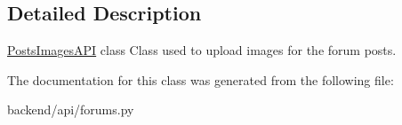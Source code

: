 \subsection{Detailed Description}
\hyperlink{classbackend_1_1api_1_1forums_1_1_posts_images_a_p_i}{Posts\+Images\+A\+P\+I} class Class used to upload images for the forum posts. 



The documentation for this class was generated from the following file\+:\begin{DoxyCompactItemize}
\item 
backend/api/forums.\+py\end{DoxyCompactItemize}
